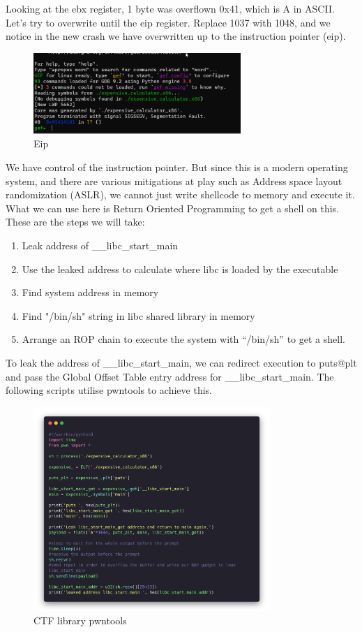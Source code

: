 Looking at the ebx register, 1 byte was overflown 0x41, which is A in ASCII\@.
Let's try to overwrite until the eip register. Replace 1037 with 1048, and we
notice in the new crash we have overwritten up to the instruction pointer (eip).

\begin{figure}[H]
  \centering
  \includegraphics[width=0.7\textwidth]{figures/gdb2}
  \caption{Eip}
  \label{f:gdb2}
\end{figure}

We have control of the instruction pointer. But since this is a modern operating
system, and there are various mitigations at play such as Address space layout
randomization (ASLR), we cannot just write shellcode to memory and execute it.
What we can use here is Return Oriented Programming to get a shell on this.
These are the steps we will take:

\begin{enumerate}
  \item Leak address of \_\_libc\_start\_main
  \item Use the leaked address to calculate where libc is loaded by the
  executable
  \item Find system address in memory
  \item Find "/bin/sh" string in libc shared library in memory
  \item Arrange an ROP chain to execute the system with ``/bin/sh'' to get
  a shell.
\end{enumerate}

To leak the address of \_\_libc\_start\_main, we can redirect execution to
puts@plt and pass the Global Offset Table entry address for \_\_libc\_start\_main.
The following scripts utilise pwntools to achieve this.

\begin{figure}[H]
  \centering
  \includegraphics[width=0.8\textwidth]{figures/pwntools}
  \caption{CTF library pwntools}
  \label{f:pwntools}
\end{figure}

